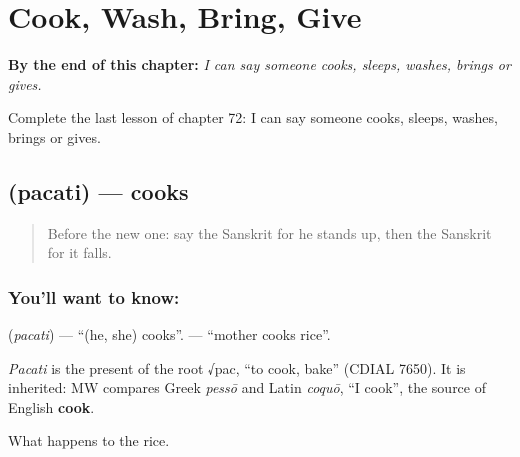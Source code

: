 
\chapter{Cook, Wash, Bring, Give}
\label{ch:sa-cook-wash-bring-give}

\begin{chapteropening}
\textbf{By the end of this chapter:} \emph{I can say someone cooks, sleeps, washes, brings or gives.}

Complete the last lesson of chapter 72: I can say someone cooks, sleeps, washes, brings or gives.
\end{chapteropening}

\section[\texorpdfstring{\sk{पचति} (pacati)}{पचति (pacati)}]{ (pacati) — cooks}

\label{lesson:SA-C72-cooks}



\begin{quote}
Before the new one: say the Sanskrit for he stands up, then the Sanskrit for it falls.
\end{quote}

\subsection*{You'll want to know: }
\textbf{} (\emph{pacati}) — \textquotedblleft{}(he, she) cooks\textquotedblright{}. \textbf{  } — \textquotedblleft{}mother cooks rice\textquotedblright{}.

\begin{cousinweb}
\emph{Pacati} is the present of the root √pac, \textquotedblleft{}to cook, bake\textquotedblright{} (CDIAL 7650). It is inherited: MW compares Greek \emph{pessō} and Latin \emph{coquō}, \textquotedblleft{}I cook\textquotedblright{}, the source of English \textbf{cook}.
\end{cousinweb}

\begin{grammarlens}[title={What you've built}]
What happens to the rice.
\end{grammarlens}

